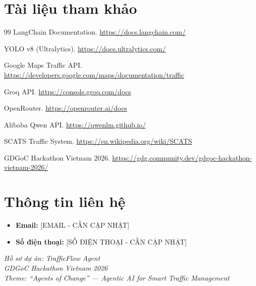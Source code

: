\documentclass[12pt,a4paper]{article}
\begin{document}
\section{Tài liệu tham khảo}

\begin{thebibliography}{99}
     LangChain Documentation. \url{https://docs.langchain.com/}

     YOLO v8 (Ultralytics). \url{https://docs.ultralytics.com/}

     Google Maps Traffic API. \url{https://developers.google.com/maps/documentation/traffic}

     Groq API. \url{https://console.groq.com/docs}

     OpenRouter. \url{https://openrouter.ai/docs}

     Alibaba Qwen API. \url{https://qwenlm.github.io/}

     SCATS Traffic System. \url{https://en.wikipedia.org/wiki/SCATS}

     GDGoC Hackathon Vietnam 2026. \url{https://gdg.community.dev/gdgoc-hackathon-vietnam-2026/}
\end{thebibliography}

\section{Thông tin liên hệ}

\begin{itemize}
    \item \textbf{Email:} {[EMAIL - CẦN CẬP NHẬT]}
    \item \textbf{Số điện thoại:} {[SỐ ĐIỆN THOẠI - CẦN CẬP NHẬT]}
\end{itemize}

\vfill

\begin{center}
    \textit{Hồ sơ dự án: TrafficFlow Agent}\\
    \textit{GDGoC Hackathon Vietnam 2026}\\
    \textit{Theme: ``Agents of Change'' — Agentic AI for Smart Traffic Management}
\end{center}
\end{document}

